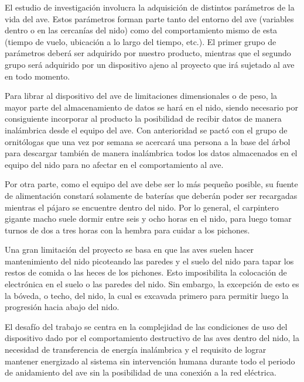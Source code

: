 El estudio de investigación involucra la adquisición de distintos parámetros de la vida del ave. Estos parámetros forman parte tanto del entorno del ave (variables dentro o en las cercanías del nido) como del comportamiento mismo de esta (tiempo de vuelo, ubicación a lo largo del tiempo, etc.). El primer grupo de parámetros deberá ser adquirido por nuestro producto, mientras que el segundo grupo será adquirido por un dispositivo ajeno al proyecto que irá sujetado al ave en todo momento.

Para librar al dispositivo del ave de limitaciones dimensionales o de peso, la mayor parte del almacenamiento de datos se hará en el nido, siendo necesario por consiguiente incorporar al producto la posibilidad de recibir datos de manera inalámbrica desde el equipo del ave. Con anterioridad se pactó con el grupo de ornitólogas que una vez por semana se acercará una persona a la base del árbol para descargar también de manera inalámbrica todos los datos almacenados en el equipo del nido para no afectar en el comportamiento al ave.

Por otra parte, como el equipo del ave debe ser lo más pequeño posible, su fuente de alimentación constará solamente de baterías que deberán poder ser recargadas mientras el pájaro se encuentre dentro del nido. Por lo general, el carpintero gigante macho suele dormir entre seis y ocho horas en el nido, para luego tomar turnos de dos a tres horas con la hembra para cuidar a los pichones.

Una gran limitación del proyecto se basa en que las aves suelen hacer mantenimiento del nido picoteando las paredes y el suelo del nido para tapar los restos de comida o las heces de los pichones. Esto imposibilita la colocación de electrónica en el suelo o las paredes del nido. Sin embargo, la excepción de esto es la bóveda, o techo, del nido, la cual es excavada primero para permitir luego la progresión hacia abajo del nido.

El desafío del trabajo se centra en la complejidad de las condiciones de uso del dispositivo dado por el comportamiento destructivo de las aves dentro del nido, la necesidad de transferencia de energía inalámbrica y el requisito de lograr mantener energizado al sistema sin intervención humana durante todo el periodo de anidamiento del ave sin la posibilidad de una conexión a la red eléctrica. 

